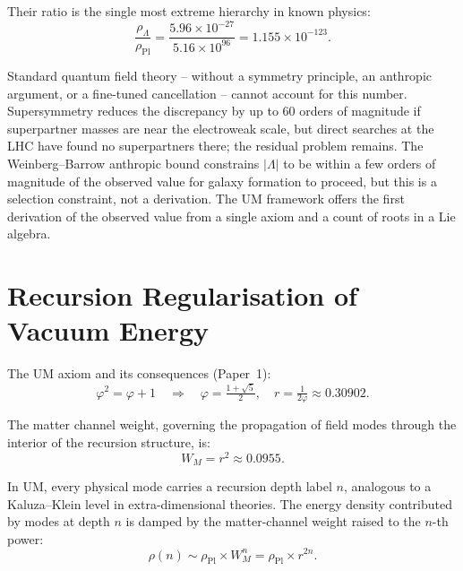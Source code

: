 \documentclass[12pt]{article}
\begin{document}
Their ratio is the single most extreme hierarchy in known physics:
\begin{equation}
  \frac{\rho_\Lambda}{\rho_{\text{Pl}}}
    = \frac{5.96 \times 10^{-27}}{5.16 \times 10^{96}}
    = 1.155 \times 10^{-123}.
  \label{eq:obs_ratio}
\end{equation}

Standard quantum field theory -- without a symmetry principle,
an anthropic argument, or a fine-tuned cancellation -- cannot
account for this number.  Supersymmetry reduces the discrepancy
by up to 60 orders of magnitude if superpartner masses are near
the electroweak scale, but direct searches at the LHC have found
no superpartners there; the residual problem remains.  The
Weinberg--Barrow anthropic bound constrains $|\Lambda|$ to be
within a few orders of magnitude of the observed value for
galaxy formation to proceed, but this is a selection constraint,
not a derivation.  The UM framework offers the first derivation
of the observed value from a single axiom and a count of roots
in a Lie algebra.

\section{Recursion Regularisation of Vacuum Energy}

The UM axiom and its consequences (Paper~1):
\begin{equation}
  \varphi^2 = \varphi + 1 \quad\Rightarrow\quad
  \varphi = \tfrac{1+\sqrt{5}}{2},\quad
  r = \tfrac{1}{2\varphi} \approx 0.30902.
  \label{eq:axiom}
\end{equation}

The matter channel weight, governing the propagation of field modes
through the interior of the recursion structure, is:
\begin{equation}
  W_M = r^2 \approx 0.0955.
  \label{eq:wm}
\end{equation}

In UM, every physical mode carries a recursion depth label $n$,
analogous to a Kaluza--Klein level in extra-dimensional theories.
The energy density contributed by modes at depth $n$ is damped by
the matter-channel weight raised to the $n$-th power:
\begin{equation}
  \rho(n) \sim \rho_{\text{Pl}} \times W_M^n
          = \rho_{\text{Pl}} \times r^{2n}.
  \label{eq:rho_n}
\end{equation}
\end{document}
